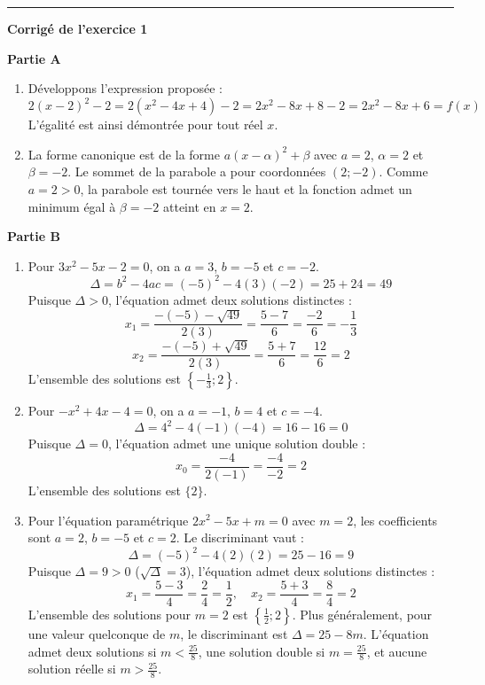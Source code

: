 \documentclass[11pt,a4paper]{article}
\newcommand{\partie}[1]{%
  \vspace{0.9em}%
  \noindent\textbf{#1}%
  \par\vspace{0.3em}%
}
\begin{document}
\vspace{2em}
\hrule
\vspace{1em}

\vspace{0.5em}
\noindent\textbf{Corrigé de l'exercice 1}

\partie{Partie A}
\begin{enumerate}
  \item Développons l'expression proposée :
  $$2(x-2)^2 - 2 = 2(x^2 - 4x + 4) - 2 = 2x^2 - 8x + 8 - 2 = 2x^2 - 8x + 6 = f(x)$$
  L'égalité est ainsi démontrée pour tout réel $x$.
  \item La forme canonique est de la forme $a(x-\alpha)^2 + \beta$ avec $a=2$, $\alpha=2$ et $\beta=-2$. 
  Le sommet de la parabole a pour coordonnées $(2 ; -2)$. 
  Comme $a = 2 > 0$, la parabole est tournée vers le haut et la fonction admet un minimum égal à $\beta = -2$ atteint en $x = 2$.
\end{enumerate}

\partie{Partie B}
\begin{enumerate}
  \item Pour $3x^2 - 5x - 2 = 0$, on a $a=3$, $b=-5$ et $c=-2$.
  $$\Delta = b^2 - 4ac = (-5)^2 - 4(3)(-2) = 25 + 24 = 49$$
  Puisque $\Delta > 0$, l'équation admet deux solutions distinctes :
  $$x_1 = \frac{-(-5) - \sqrt{49}}{2(3)} = \frac{5 - 7}{6} = \frac{-2}{6} = -\frac{1}{3}$$
  $$x_2 = \frac{-(-5) + \sqrt{49}}{2(3)} = \frac{5 + 7}{6} = \frac{12}{6} = 2$$
  L'ensemble des solutions est $\left\{-\frac{1}{3} ; 2\right\}$.
  
  \item Pour $-x^2 + 4x - 4 = 0$, on a $a=-1$, $b=4$ et $c=-4$.
  $$\Delta = 4^2 - 4(-1)(-4) = 16 - 16 = 0$$
  Puisque $\Delta = 0$, l'équation admet une unique solution double :
  $$x_0 = \frac{-4}{2(-1)} = \frac{-4}{-2} = 2$$
  L'ensemble des solutions est $\{2\}$.
  
  \item Pour l'équation paramétrique $2x^2 - 5x + m = 0$ avec $m = 2$, les coefficients sont $a = 2$, $b = -5$ et $c = 2$.
  Le discriminant vaut :
  $$\Delta = (-5)^2 - 4(2)(2) = 25 - 16 = 9$$
  Puisque $\Delta = 9 > 0$ ($\sqrt{\Delta} = 3$), l'équation admet deux solutions distinctes :
  $$x_1 = \frac{5 - 3}{4} = \frac{2}{4} = \frac{1}{2}, \quad x_2 = \frac{5 + 3}{4} = \frac{8}{4} = 2$$
  L'ensemble des solutions pour $m = 2$ est $\left\{\frac{1}{2} ; 2\right\}$.
  Plus généralement, pour une valeur quelconque de $m$, le discriminant est $\Delta = 25 - 8m$. L'équation admet deux solutions si $m < \frac{25}{8}$, une solution double si $m = \frac{25}{8}$, et aucune solution réelle si $m > \frac{25}{8}$.
\end{enumerate}
\end{document}
